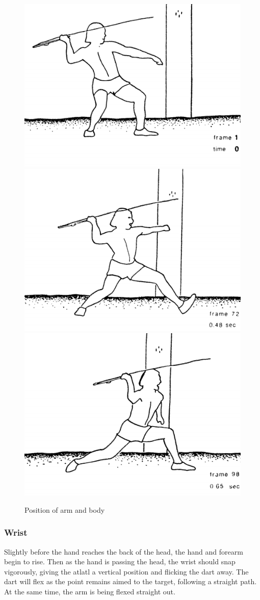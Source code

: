 \documentclass[a4paper, xcolor = usenames,dvipsnames]{article}
\begin{document}
\begin{figure}

{\centering \includegraphics[width=0.3\linewidth]{res/observations/1} \includegraphics[width=0.3\linewidth]{res/observations/2} \includegraphics[width=0.3\linewidth]{res/observations/3} 

}

\caption{Position of arm and body}\label{fig:arm-body-pos}
\end{figure}

\hypertarget{wrist}{%
\subsubsection{Wrist}\label{wrist}}

Slightly before the hand reaches the back of the head, the hand and forearm begin to rise. Then as the hand is passing the head, the wrist should snap vigorously, giving the atlatl a vertical position and flicking the dart away. The dart will flex as the point remains aimed to the target, following a straight path. At the same time, the arm is being flexed straight out.
\end{document}
